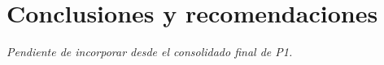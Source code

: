 \section{Conclusiones y recomendaciones}

\textit{Pendiente de incorporar desde el consolidado final de P1.}
